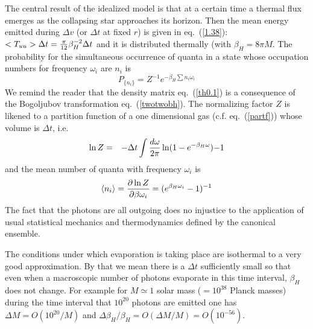 \documentclass[12pt,oneside]{report}
\def\om{\omega	}
\begin{document}
The central result of the idealized model is that at a certain 
time 
a thermal flux emerges
as the collapsing star approaches its horizon. Then the mean energy emitted 
during $\Delta v$ (or $\Delta t$ at fixed $r$) is
given in eq.~(\ref{1.38}): $ <T_{uu}> \Delta t  =
{\pi \over 12}\beta_H^{-2} \Delta t$ and it is distributed
thermally (with $ \beta_H  = 8\pi M$. 
The probability for the simultaneous occurrence of quanta in a
state whose occupation numbers for frequency $\omega_i$ are $n_i$ is
\begin{equation}
P_{\{ n_i\}} = Z^{-1} e^{- \beta_H \sum n_i \omega_i}
\label{th0.1}
\end{equation}
We remind the reader that the density matrix eq.~(\ref{th0.1}) is a 
consequence of the Bogoljubov transformation
 eq.~(\ref{twotwobh}).
The normalizing factor $Z$ is likened to a partition function of a one
dimensional gas (c.f. eq.~(\ref{partf}))
whose volume is $\Delta t$, i.e.
\begin{eqnarray}
\ln Z &=& -\Delta t \int {d \omega \over 2 \pi} \ln (1 - e^{-\beta_H
\omega})
{-1}
\label{th0.2}
\end{eqnarray}
and
the mean number of quanta with frequency $\om_i$ is
\begin{equation}
\langle n_i \rangle = {\partial \ln Z \over
\partial \beta \omega_i} =
(e^{\beta_H \omega_i} -1)^{-1}
\label{th0.3}
\end{equation}
The fact that the photons are all outgoing does no injustice to the
application of usual statistical mechanics and thermodynamics defined by
the canonical ensemble.

The conditions under which
evaporation is taking place are isothermal to a very good approximation.
By that we mean there is a $\Delta t$ sufficiently small so that even
when a macroscopic number of photons evaporate in this time interval,
$\beta_H$ does not change. For example for $M\simeq 1$ solar mass
($ = 10^{38}$ Planck masses) during the time interval
that $10^{20}$ photons are emitted one has $\Delta M = O(10^{20}/M)$
and $\Delta \beta_H / \beta_H =
O(\Delta M / M) = O(10^{-56})$.
\end{document}
